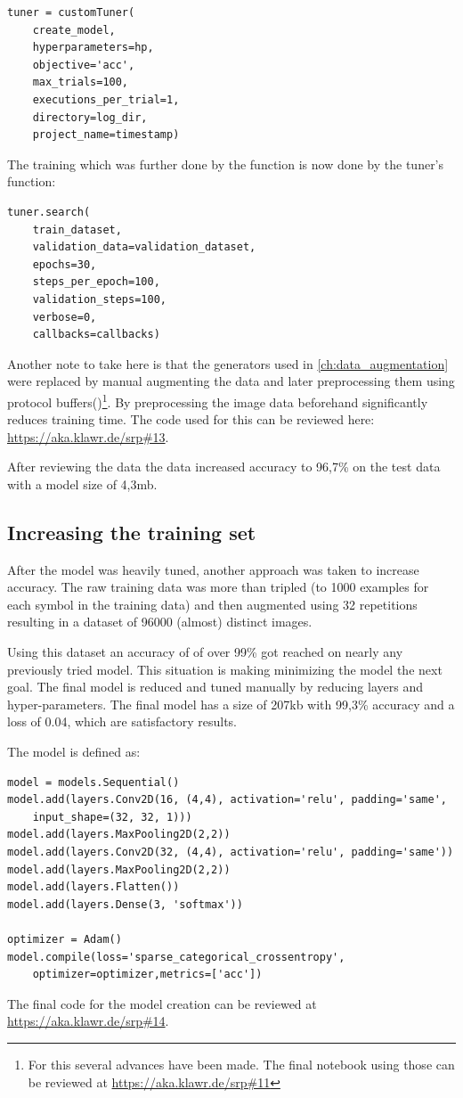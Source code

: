 \begin{lstlisting}
tuner = customTuner(
    create_model,
    hyperparameters=hp,
    objective='acc',
    max_trials=100,
    executions_per_trial=1,
    directory=log_dir,
    project_name=timestamp)
\end{lstlisting}

The training which was further done by the  function is now done by the tuner's  function:

\begin{lstlisting}
tuner.search(
    train_dataset,
    validation_data=validation_dataset,
    epochs=30,
    steps_per_epoch=100,
    validation_steps=100,
    verbose=0,
    callbacks=callbacks)
\end{lstlisting}

Another note to take here is that the generators used in \ref{ch:data_augmentation} were replaced by manual augmenting the data and later preprocessing them using protocol buffers()\footnote{For this several advances have been made. The final notebook using those can be reviewed at \url{https://aka.klawr.de/srp\#11}}.
By preprocessing the image data beforehand significantly reduces training time.
The code used for this can be reviewed here: \url{https://aka.klawr.de/srp\#13}.

After reviewing the data the data increased accuracy to 96,7\% on the test data with a model size of 4,3mb.

\subsection{Increasing the training set}

After the model was heavily tuned, another approach was taken to increase accuracy.
The raw training data was more than tripled (to 1000 examples for each symbol in the training data) and then augmented using 32 repetitions resulting in a dataset of 96000 (almost) distinct images.

Using this dataset an accuracy of of over 99\% got reached on nearly any previously tried model.
This situation is making minimizing the model the next goal.
The final model is reduced and tuned manually by reducing layers and hyper-parameters.
The final model has a size of 207kb with 99,3\% accuracy and a loss of 0.04, which are satisfactory results.

The model is defined as:
\begin{lstlisting}
model = models.Sequential()
model.add(layers.Conv2D(16, (4,4), activation='relu', padding='same',
    input_shape=(32, 32, 1)))
model.add(layers.MaxPooling2D(2,2))
model.add(layers.Conv2D(32, (4,4), activation='relu', padding='same'))
model.add(layers.MaxPooling2D(2,2))
model.add(layers.Flatten())
model.add(layers.Dense(3, 'softmax'))

optimizer = Adam()
model.compile(loss='sparse_categorical_crossentropy',
    optimizer=optimizer,metrics=['acc'])
\end{lstlisting}

The final code for the model creation can be reviewed at \url{https://aka.klawr.de/srp\#14}.
